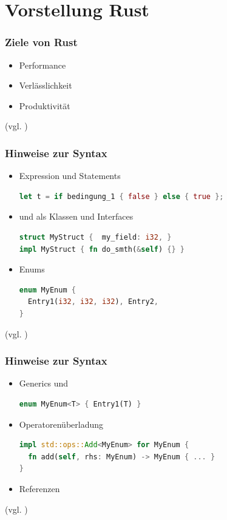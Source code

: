 \documentclass{beamer}
\begin{document}
\section{Vorstellung Rust}
\begin{frame}[fragile]
  \frametitle{Ziele von Rust}
  \begin{itemize}
    \item Performance
    \pause
    \item Verlässlichkeit
    \pause
    \item Produktivität
  \end{itemize}
  {\small (vgl.  \cite{JavaGenerics} \cite[S. 196 ff.]{SK19} \cite{WhyRust})}
\end{frame}

\begin{frame}[fragile]
  \frametitle{Hinweise zur Syntax}
  \begin{itemize}
    \item Expression und Statements \begin{lstlisting}[language=rust]
let t = if bedingung_1 { false } else { true };\end{lstlisting}
    \pause
    \item {} und  als Klassen und Interfaces \begin{lstlisting}[language=rust]
struct MyStruct {  my_field: i32, }
impl MyStruct { fn do_smth(&self) {} }\end{lstlisting}
    \pause
    \item Enums \begin{lstlisting}[language=rust]
enum MyEnum {
  Entry1(i32, i32, i32), Entry2,
}\end{lstlisting}
  \end{itemize}
  {\small (vgl. \cite[S. 122 ff.]{BO18})}
\end{frame}

\begin{frame}[fragile]
  \frametitle{Hinweise zur Syntax}
  \begin{itemize}
    \item Generics und  \begin{lstlisting}[language=rust]
enum MyEnum<T> { Entry1(T) }\end{lstlisting}
    \pause
    \item Operatorenüberladung \begin{lstlisting}[language=rust]
impl std::ops::Add<MyEnum> for MyEnum {
  fn add(self, rhs: MyEnum) -> MyEnum { ... }
}\end{lstlisting}
    \pause
    \item Referenzen
  \end{itemize}
  {\small (vgl. \cite[S. 246 ff.]{BO18} \cite{TraitBoundariesEx} \cite[S. 196 ff.]{SK19})}
\end{frame}
\end{document}
